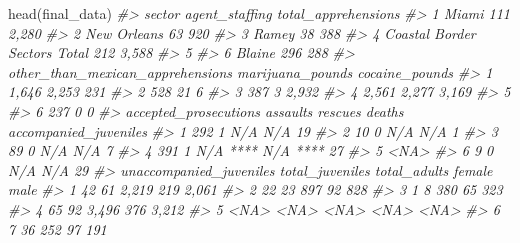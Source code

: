 \documentclass[
]{krantz}
\makeatletter
\newenvironment{Shaded}{\begin{snugshade}}{\end{snugshade}}
\newcommand{\CommentTok}[1]{\textcolor[rgb]{0.37,0.37,0.37}{\textit{#1}}}
\newcommand{\FunctionTok}[1]{\textcolor[rgb]{0,0,0}{#1}}
\newcommand{\NormalTok}[1]{#1}
\newenvironment{kframe}{%
\medskip{}
\setlength{\fboxsep}{.8em}
 \def\at@end@of@kframe{}%
 \ifinner\ifhmode%
  \def\at@end@of@kframe{\end{minipage}}%
  \begin{minipage}{\columnwidth}%
 \fi\fi%
 \def\FrameCommand##1{\hskip\@totalleftmargin \hskip-\fboxsep
 \colorbox{shadecolor}{##1}\hskip-\fboxsep
     \hskip-\linewidth \hskip-\@totalleftmargin \hskip\columnwidth}%
 \MakeFramed {\advance\hsize-\width
   \@totalleftmargin\z@ \linewidth\hsize
   \@setminipage}}%
 {\par\unskip\endMakeFramed%
 \at@end@of@kframe}
\renewenvironment{Shaded}{\begin{kframe}}{\end{kframe}}
\makeatother
\begin{document}
\begin{Shaded}
\begin{Highlighting}[]
\FunctionTok{head}\NormalTok{(final\_data)}
\CommentTok{\#\textgreater{}                         sector agent\_staffing total\_apprehensions}
\CommentTok{\#\textgreater{} 1                        Miami            111               2,280}
\CommentTok{\#\textgreater{} 2                  New Orleans             63                 920}
\CommentTok{\#\textgreater{} 3                        Ramey             38                 388}
\CommentTok{\#\textgreater{} 4 Coastal Border Sectors Total            212               3,588}
\CommentTok{\#\textgreater{} 5                                                                }
\CommentTok{\#\textgreater{} 6                       Blaine            296                 288}
\CommentTok{\#\textgreater{}   other\_than\_mexican\_apprehensions marijuana\_pounds cocaine\_pounds}
\CommentTok{\#\textgreater{} 1                            1,646            2,253            231}
\CommentTok{\#\textgreater{} 2                              528               21              6}
\CommentTok{\#\textgreater{} 3                              387                3          2,932}
\CommentTok{\#\textgreater{} 4                            2,561            2,277          3,169}
\CommentTok{\#\textgreater{} 5                                                                 }
\CommentTok{\#\textgreater{} 6                              237                0              0}
\CommentTok{\#\textgreater{}   accepted\_prosecutions assaults  rescues   deaths accompanied\_juveniles}
\CommentTok{\#\textgreater{} 1                   292        1      N/A      N/A                    19}
\CommentTok{\#\textgreater{} 2                    10        0      N/A      N/A                     1}
\CommentTok{\#\textgreater{} 3                    89        0      N/A      N/A                     7}
\CommentTok{\#\textgreater{} 4                   391        1 N/A **** N/A ****                    27}
\CommentTok{\#\textgreater{} 5                                                                   \textless{}NA\textgreater{}}
\CommentTok{\#\textgreater{} 6                     9        0      N/A      N/A                    29}
\CommentTok{\#\textgreater{}   unaccompanied\_juveniles total\_juveniles total\_adults female  male}
\CommentTok{\#\textgreater{} 1                      42              61        2,219    219 2,061}
\CommentTok{\#\textgreater{} 2                      22              23          897     92   828}
\CommentTok{\#\textgreater{} 3                       1               8          380     65   323}
\CommentTok{\#\textgreater{} 4                      65              92        3,496    376 3,212}
\CommentTok{\#\textgreater{} 5                    \textless{}NA\textgreater{}            \textless{}NA\textgreater{}         \textless{}NA\textgreater{}   \textless{}NA\textgreater{}  \textless{}NA\textgreater{}}
\CommentTok{\#\textgreater{} 6                       7              36          252     97   191}
\end{Highlighting}
\end{Shaded}
\end{document}
